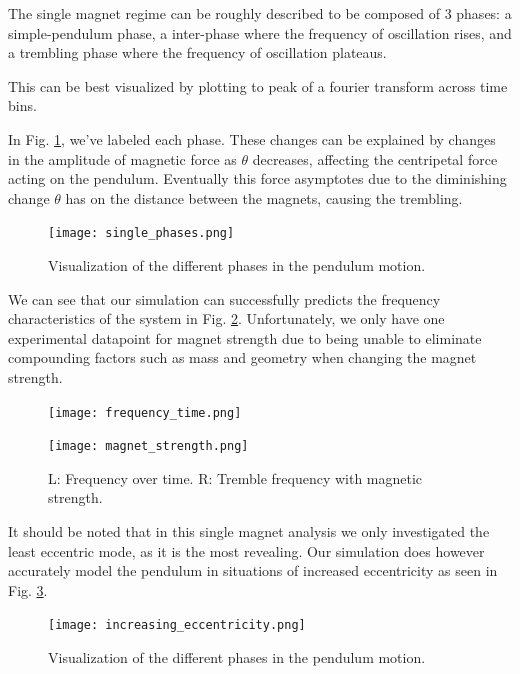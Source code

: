 \documentclass[prl,twocolumn,amsmath,amssymb,superscriptaddress]{revtex4-2}
\begin{document}
The single magnet regime can be roughly described to be composed of 3 phases: a simple-pendulum phase, a inter-phase where the frequency of oscillation rises, and a trembling phase where the frequency of oscillation plateaus.


This can be best visualized by plotting to peak of a fourier transform across time bins.

In Fig. \ref{fig:phases}, we've labeled each phase. These changes can be explained by changes in the amplitude of magnetic force as $\theta$ decreases, affecting the centripetal force acting on the pendulum. Eventually this force asymptotes due to the diminishing change $\theta$ has on the distance between the magnets, causing the trembling.

\begin{figure}[htb]
    \texttt{[image: single\_phases.png]}
    \caption{Visualization of the different phases in the pendulum motion.}
    \label{fig:phases}
\end{figure}

We can see that our simulation can successfully predicts the frequency characteristics of the system in Fig. \ref{fig:freq_magnet}. Unfortunately, we only have one experimental datapoint for magnet strength due to being unable to eliminate compounding factors such as mass and geometry when changing the magnet strength.

\begin{figure}[htb]
    \begin{minipage}{0.45\linewidth}
        \texttt{[image: frequency\_time.png]}
    \end{minipage}%
    \begin{minipage}{0.45\linewidth}
        \texttt{[image: magnet\_strength.png]}
    \end{minipage}
    \caption{L: Frequency over time. R: Tremble frequency with magnetic strength.}
    \label{fig:freq_magnet}
\end{figure}

\newpage
It should be noted that in this single magnet analysis we only investigated the least eccentric mode, as it is the most revealing. Our simulation does however accurately model the pendulum in situations of increased eccentricity as seen in Fig. \ref{fig:eccentricity}.

\begin{figure}[htb]
    \texttt{[image: increasing\_eccentricity.png]}
    \caption{Visualization of the different phases in the pendulum motion.}
    \label{fig:eccentricity}
\end{figure}
\end{document}
